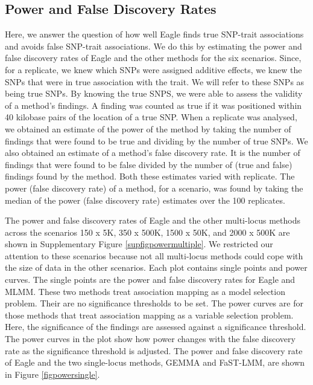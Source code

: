 \documentclass{article}
\begin{document}
 



\subsection{Power and False Discovery Rates}

Here, we answer the question of how well Eagle finds true SNP-trait associations and avoids false SNP-trait associations. We do this by estimating the power and false discovery rates of Eagle and the other methods for the six scenarios.  Since, for a replicate, we knew which SNPs were assigned additive effects, we knew the SNPs that were in true association with the trait. We will refer to these SNPs as being
true SNPs. By knowing the true SNPS, we were able to assess the validity of a method's findings. A  finding was counted as true if it was positioned within 40 kilobase pairs of the location of a true SNP. When a replicate was analysed, we obtained an estimate of the power of the method by taking  the number of findings that were found to be  true and dividing by the 
number of true SNPs. We also obtained an estimate of a method's false discovery rate. It is the number of findings that were found to be false divided by the number of (true and false) findings found by the method.  Both these estimates varied with replicate. 
The power (false discovery rate) of a method, for a scenario, was found by taking the median of the power (false discovery rate) estimates over the 100 replicates. 


The power and false discovery rates of Eagle and the other multi-locus methods across the scenarios 150 x 5K, 350 x 500K, 1500 x 50K, and 2000 x 500K are shown in Supplementary Figure \ref{supfigpowermultiple}.  We restricted our attention to these scenarios because not all 
multi-locus methods could cope with the size of data in the other scenarios. 
  Each plot contains 
single points and power curves. The single points are the power and false discovery rates for Eagle and MLMM.
These two methods treat association mapping as a model selection problem. Their are no significance thresholds to be set. 
The power curves are for those methods that treat association mapping as a variable selection problem. Here, the 
significance of the findings are assessed against a significance threshold. The power curves in the plot show how power changes with 
the false discovery rate as the significance threshold  is adjusted. 
The power and false discovery rate of Eagle and the two single-locus methods, GEMMA and FaST-LMM,  are shown in
 Figure \ref{figpowersingle}. 
\end{document}
